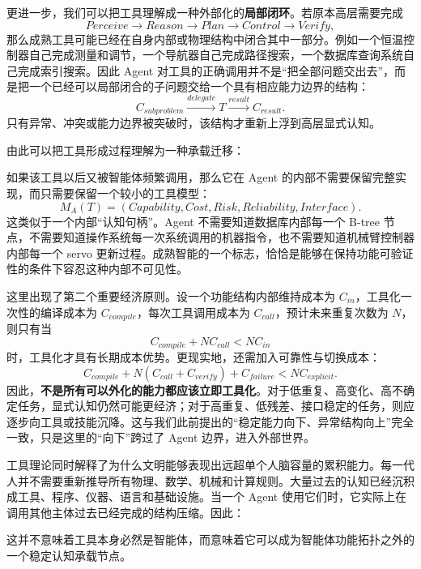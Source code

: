 更进一步，我们可以把工具理解成一种外部化的\textbf{局部闭环}。若原本高层需要完成
\[
Perceive
\rightarrow
Reason
\rightarrow
Plan
\rightarrow
Control
\rightarrow
Verify,
\]
那么成熟工具可能已经在自身内部或物理结构中闭合其中一部分。例如一个恒温控制器自己完成测量和调节，一个导航器自己完成路径搜索，一个数据库查询系统自己完成索引搜索。因此 Agent 对工具的正确调用并不是``把全部问题交出去''，而是把一个已经可以局部闭合的子问题交给一个具有相应能力边界的结构：
\[
C_{subproblem}
\xrightarrow{delegate}
T
\xrightarrow{result}
C_{result}.
\]
只有异常、冲突或能力边界被突破时，该结构才重新上浮到高层显式认知。

由此可以把工具形成过程理解为一种承载迁移：
\begin{statementbox}
\centering
{}
\end{statementbox}
如果该工具以后又被智能体频繁调用，那么它在 Agent 的内部不需要保留完整实现，而只需要保留一个较小的工具模型：
\[
M_A(T)
=
(
Capability,
Cost,
Risk,
Reliability,
Interface
).
\]
这类似于一个内部``认知句柄''。Agent 不需要知道数据库内部每一个 B-tree 节点，不需要知道操作系统每一次系统调用的机器指令，也不需要知道机械臂控制器内部每一个 servo 更新过程。成熟智能的一个标志，恰恰是能够在保持功能可验证性的条件下容忍这种内部不可见性。

这里出现了第二个重要经济原则。设一个功能结构内部维持成本为 $C_{in}$，工具化一次性的编译成本为 $C_{compile}$，每次工具调用成本为 $C_{call}$，预计未来重复次数为 $N$，则只有当
\[
C_{compile}
+
N C_{call}
<
N C_{in}
\]
时，工具化才具有长期成本优势。更现实地，还需加入可靠性与切换成本：
\[
C_{compile}
+
N(C_{call}+C_{verify})
+
C_{failure}
<
N C_{explicit}.
\]
因此，\textbf{不是所有可以外化的能力都应该立即工具化}。对于低重复、高变化、高不确定任务，显式认知仍然可能更经济；对于高重复、低残差、接口稳定的任务，则应逐步向工具或技能沉降。这与我们此前提出的``稳定能力向下、异常结构向上''完全一致，只是这里的``向下''跨过了 Agent 边界，进入外部世界。

工具理论同时解释了为什么文明能够表现出远超单个人脑容量的累积能力。每一代人并不需要重新推导所有物理、数学、机械和计算规则。大量过去的认知已经沉积成工具、程序、仪器、语言和基础设施。当一个 Agent 使用它们时，它实际上在调用其他主体过去已经完成的结构压缩。因此：
\begin{statementbox}
\centering
{}
\end{statementbox}
这并不意味着工具本身必然是智能体，而意味着它可以成为智能体功能拓扑之外的一个稳定认知承载节点。

